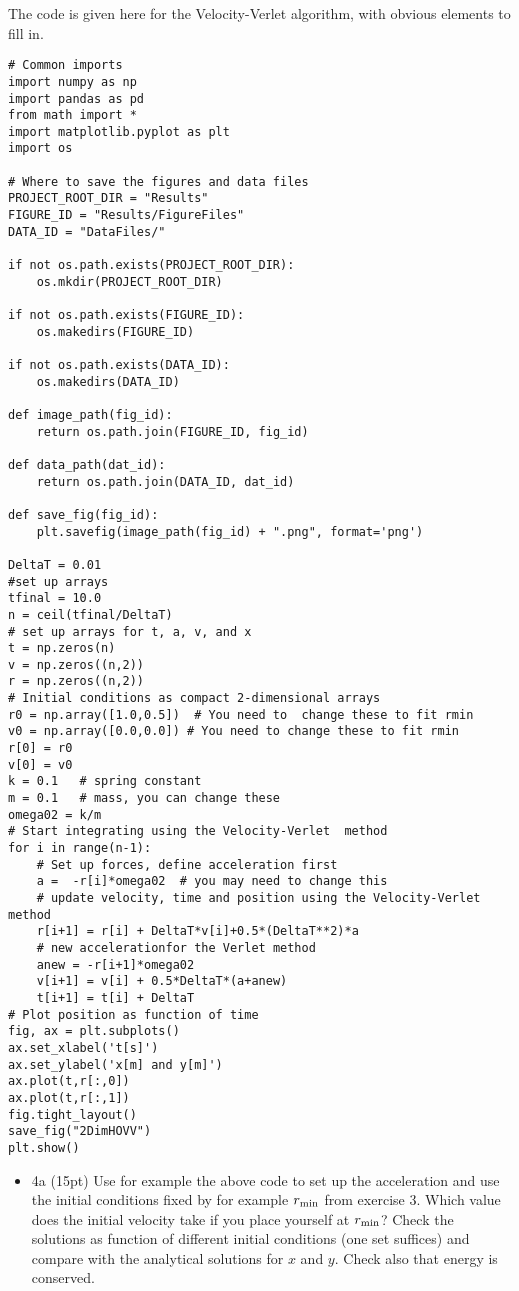 \documentclass[%
oneside,                 %
final,                   %
10pt]{article}
\begin{document}
The code is given here for the Velocity-Verlet algorithm, with obvious elements to fill in. 
\begin{verbatim}
# Common imports
import numpy as np
import pandas as pd
from math import *
import matplotlib.pyplot as plt
import os

# Where to save the figures and data files
PROJECT_ROOT_DIR = "Results"
FIGURE_ID = "Results/FigureFiles"
DATA_ID = "DataFiles/"

if not os.path.exists(PROJECT_ROOT_DIR):
    os.mkdir(PROJECT_ROOT_DIR)

if not os.path.exists(FIGURE_ID):
    os.makedirs(FIGURE_ID)

if not os.path.exists(DATA_ID):
    os.makedirs(DATA_ID)

def image_path(fig_id):
    return os.path.join(FIGURE_ID, fig_id)

def data_path(dat_id):
    return os.path.join(DATA_ID, dat_id)

def save_fig(fig_id):
    plt.savefig(image_path(fig_id) + ".png", format='png')

DeltaT = 0.01
#set up arrays 
tfinal = 10.0
n = ceil(tfinal/DeltaT)
# set up arrays for t, a, v, and x
t = np.zeros(n)
v = np.zeros((n,2))
r = np.zeros((n,2))
# Initial conditions as compact 2-dimensional arrays
r0 = np.array([1.0,0.5])  # You need to  change these to fit rmin
v0 = np.array([0.0,0.0]) # You need to change these to fit rmin
r[0] = r0
v[0] = v0
k = 0.1   # spring constant
m = 0.1   # mass, you can change these
omega02 = k/m
# Start integrating using the Velocity-Verlet  method
for i in range(n-1):
    # Set up forces, define acceleration first
    a =  -r[i]*omega02  # you may need to change this
    # update velocity, time and position using the Velocity-Verlet method
    r[i+1] = r[i] + DeltaT*v[i]+0.5*(DeltaT**2)*a
    # new accelerationfor the Verlet method
    anew = -r[i+1]*omega02  
    v[i+1] = v[i] + 0.5*DeltaT*(a+anew)
    t[i+1] = t[i] + DeltaT
# Plot position as function of time    
fig, ax = plt.subplots()
ax.set_xlabel('t[s]')
ax.set_ylabel('x[m] and y[m]')
ax.plot(t,r[:,0])
ax.plot(t,r[:,1])
fig.tight_layout()
save_fig("2DimHOVV")
plt.show()

\end{verbatim}

\begin{itemize}
\item 4a (15pt) Use for example the above code to set up the acceleration and use the initial conditions fixed by for example $r_{\rm min}$ from exercise 3. Which value does the initial velocity take if you place yourself at $r_{\rm min}$?  Check the solutions as function of  different initial conditions (one set suffices) and compare with the analytical solutions for $x$ and $y$. Check also that energy is conserved.
\end{itemize}
\end{document}

